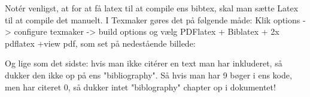 \begin{remark}
Notér venligst, at for at få latex til at compile ens bibtex, skal man sætte Latex til at compile det manuelt. I Texmaker gøres det på følgende måde: Klik options -> configure texmaker -> build options og vælg PDFlatex + Biblatex + 2x pdflatex +view pdf, som set på nedestående billede:
\begin{center}
\end{center}
Og lige som det sidste: hvis man ikke citérer en text man har inkluderet, så dukker den ikke op på ens "bibliography". Så hvis man har 9 bøger i ens kode, men har citeret 0, så dukker intet "biblography" chapter op i dokumentet!
\end{remark}
\fi